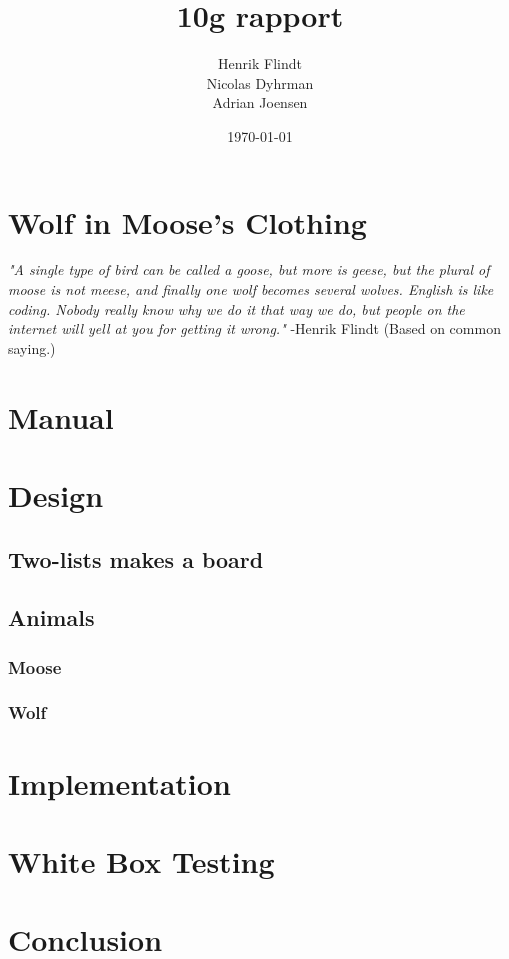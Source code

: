 \documentclass{article}
\title{10g rapport}
\author{Henrik Flindt\\Nicolas Dyhrman\\Adrian Joensen}
\date{\today}
\begin{document}
    \maketitle
    
    \section*{Wolf in Moose's Clothing}
    \textit{"A single type of bird can be called a goose, but more is geese, but the plural of moose is not meese, and finally one wolf becomes several wolves. English is like coding. Nobody really know why we do it that way we do, but people on the internet will yell at you for getting it wrong."} -Henrik Flindt (Based on common saying.)
    \section{Manual}
   
    
    \section{Design}
    \subsection{Two-lists makes a board}
    \subsection{Animals}
    \subsubsection{Moose}
    \subsubsection{Wolf}    

    \section{Implementation}
       
         
    \section{White Box Testing}
   	   
    \section{Conclusion}
     
\end{document}
